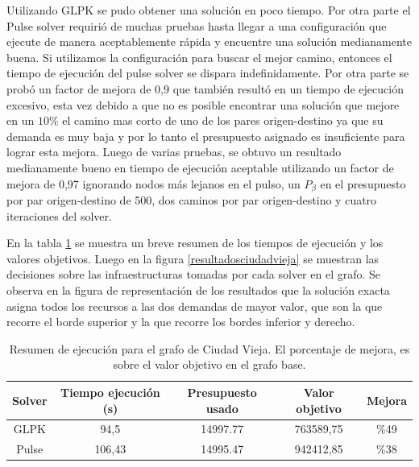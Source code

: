 \documentclass{article}
\begin{document}
  Utilizando GLPK se pudo obtener una solución en poco tiempo. Por otra parte el Pulse solver requirió de muchas pruebas hasta llegar a una configuración que ejecute de manera aceptablemente rápida y encuentre una solución medianamente buena. Si utilizamos la configuración para buscar el mejor camino, entonces el tiempo de ejecución del pulse solver se dispara indefinidamente. Por otra parte se probó un factor de mejora de 0,9 que también resultó en un tiempo de ejecución excesivo, esta vez debido a que no es posible encontrar una solución que mejore en un $10\%$ el camino mas corto de uno de los pares origen-destino ya que su demanda es muy baja y por lo tanto el presupuesto asignado es insuficiente para lograr esta mejora. Luego de varias pruebas, se obtuvo un resultado medianamente bueno en tiempo de ejecución aceptable utilizando un factor de mejora de 0,97 ignorando nodos más lejanos en el pulso, un $P_{\beta}$ en el presupuesto por par origen-destino de 500, dos caminos por par origen-destino y cuatro iteraciones del solver.
  
  En la tabla \ref{table:resultadosciudadvieja} se muestra un breve resumen de los tiempos de ejecución y los valores objetivos. Luego en la figura \ref{resultadosciudadvieja} se muestran las decisiones sobre las infraestructuras tomadas por cada solver en el grafo. Se observa en la figura de representación de los resultados que la solución exacta asigna todos los recursos a las dos demandas de mayor valor, que son la que recorre el borde superior y la que recorre los bordes inferior y derecho.

  \begin{table}[h!]
    \centering
    \begin{tabular}{ccccc}
      \toprule
      Solver & Tiempo ejecución (s) & Presupuesto usado & Valor objetivo & Mejora \\
      \midrule
      GLPK  & 94,5   & 14997.77 & 763589,75 & \%49 \\
      Pulse & 106,43 & 14995.47 & 942412,85 & \%38 \\
      \bottomrule
    \end{tabular}
    \caption{Resumen de ejecución para el grafo de Ciudad Vieja. El porcentaje de mejora, es sobre el valor objetivo en el grafo base.}\label{table:resultadosciudadvieja}
  \end{table}
\end{document}

